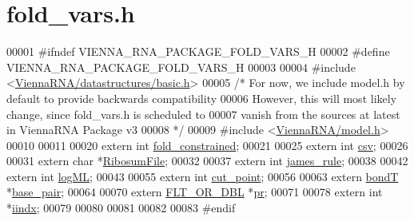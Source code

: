 \hypertarget{fold__vars_8h_source}{}\section{fold\+\_\+vars.\+h}
\label{fold__vars_8h_source}

\begin{DoxyCode}
00001 \textcolor{preprocessor}{#ifndef VIENNA\_RNA\_PACKAGE\_FOLD\_VARS\_H}
00002 \textcolor{preprocessor}{#define VIENNA\_RNA\_PACKAGE\_FOLD\_VARS\_H}
00003 
00004 \textcolor{preprocessor}{#include <\hyperlink{datastructures_2basic_8h}{ViennaRNA/datastructures/basic.h}>}
00005 \textcolor{comment}{/*  For now, we include model.h by default to provide backwards compatibility}
00006 \textcolor{comment}{    However, this will most likely change, since fold\_vars.h is scheduled to}
00007 \textcolor{comment}{    vanish from the sources at latest in ViennaRNA Package v3}
00008 \textcolor{comment}{*/}
00009 \textcolor{preprocessor}{#include <\hyperlink{model_8h}{ViennaRNA/model.h}>}
00010 
00011 
00020 \textcolor{keyword}{extern} \textcolor{keywordtype}{int}    \hyperlink{fold__vars_8h_a0afc287c2464866d94858c39175154af}{fold\_constrained};
00021 
00025 \textcolor{keyword}{extern} \textcolor{keywordtype}{int}  \hyperlink{fold__vars_8h_af2763d55a74663a5e60652b8880baa5b}{csv};
00026 
00031 \textcolor{keyword}{extern} \textcolor{keywordtype}{char} *\hyperlink{fold__vars_8h_a5dbaa0cca2c8c82048a0f0e38e164944}{RibosumFile};   
00032 
00037 \textcolor{keyword}{extern} \textcolor{keywordtype}{int}  \hyperlink{fold__vars_8h_af349001ad3b4d008d0051d935b1b6261}{james\_rule};
00038 
00042 \textcolor{keyword}{extern} \textcolor{keywordtype}{int}  \hyperlink{fold__vars_8h_a80c3c5fd35e7479704cc91d2d0367743}{logML};
00043 
00055 \textcolor{keyword}{extern} \textcolor{keywordtype}{int}  \hyperlink{fold__vars_8h_ab9b2c3a37a5516614c06d0ab54b97cda}{cut\_point};
00056 
00063 \textcolor{keyword}{extern} \hyperlink{group__data__structures_structvrna__bp__stack__s}{bondT}  *\hyperlink{fold__vars_8h_a0244a629b5ab4f58b77590c3dfd130dc}{base\_pair};
00064 
00070 \textcolor{keyword}{extern} \hyperlink{group__data__structures_ga31125aeace516926bf7f251f759b6126}{FLT\_OR\_DBL} *\hyperlink{fold__vars_8h_ac98ec419070aee6831b44e5c700f090f}{pr};
00071 
00078 \textcolor{keyword}{extern} \textcolor{keywordtype}{int}   *\hyperlink{fold__vars_8h_a92089ae3a51b5d75a14ce9cc29cc8317}{iindx};
00079 
00080 
00081 
00082 
00083 \textcolor{preprocessor}{#endif}
\end{DoxyCode}
